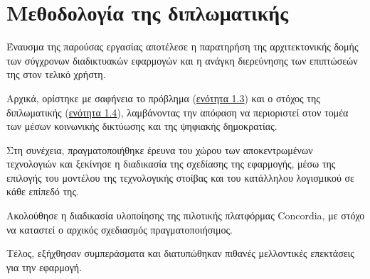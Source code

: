 \section{Μεθοδολογία της διπλωματικής}\label{section:1-5-methodology}

Έναυσμα της παρούσας εργασίας αποτέλεσε η παρατηρήση της αρχιτεκτονικής δομής των σύγχρονων διαδικτυακών εφαρμογών και η ανάγκη διερεύνησης των επιπτώσεών της στον τελικό χρήστη. 

Αρχικά, ορίστηκε με σαφήνεια το πρόβλημα (\hyperref[section:1-3-problem-definition]{ενότητα 1.3}) και ο στόχος της διπλωματικής (\hyperref[section:1-4-thesis-goal]{ενότητα 1.4}), λαμβάνοντας την απόφαση να περιοριστεί στον τομέα των μέσων κοινωνικής δικτύωσης και της ψηφιακής δημοκρατίας.

Στη συνέχεια, πραγματοποιήθηκε έρευνα του χώρου των αποκεντρωμένων τεχνολογιών και ξεκίνησε η διαδικασία της σχεδίασης της εφαρμογής, μέσω της επιλογής του μοντέλου της τεχνολογικής στοίβας και του κατάλληλου λογισμικού σε κάθε επίπεδό της.

Ακολούθησε η διαδικασία υλοποίησης της πιλοτικής πλατφόρμας Concordia, με στόχο να καταστεί ο αρχικός σχεδιασμός πραγματοποιήσιμος.

Τέλος, εξήχθησαν συμπεράσματα και διατυπώθηκαν πιθανές μελλοντικές επεκτάσεις για την εφαρμογή.
